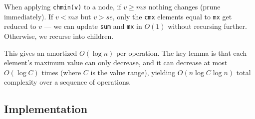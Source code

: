 When applying \texttt{chmin(v)} to a node, if $v \geq mx$ nothing changes (prune immediately). If $v < mx$ but $v > se$, only the \texttt{cmx} elements equal to \texttt{mx} get reduced to $v$ --- we can update \texttt{sum} and \texttt{mx} in $O(1)$ without recursing further. Otherwise, we recurse into children.

This gives an amortized $O(\log n)$ per operation. The key lemma is that each element's maximum value can only decrease, and it can decrease at most $O(\log C)$ times (where $C$ is the value range), yielding $O(n \log C \log n)$ total complexity over a sequence of operations.

\subsection{Implementation}

